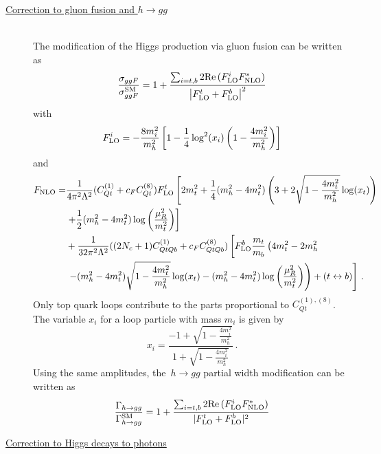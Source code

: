 \begin{description}
	\item [\underline{Correction to gluon fusion and $h\to gg $ }] \hfill \vspace{0.3cm} \\
	The modification of the Higgs production via gluon fusion can be written as
	\begin{equation}
		\frac{\sigma_{ggF}}{\sigma_{ggF}^{\mathrm{SM}}}= 1+ \frac{ \sum_{i=t,b} 2 \mbox{Re}\,(F_{\textrm{LO}}^i F^*_{\textrm{NLO}})}{\left| F_{\textrm{LO}}^t+F_{\textrm{LO}}^b  \right|^2} \label{eq:production}
	\end{equation}
	with 
	\begin{equation}
		F_{\textrm{LO}}^i=-\frac{8m_i^2}{m_h^2}\left[1-\frac{1}{4}\log^2(x_i)\left(1-\frac{4m_i^2}{m_h^2}\right)\right]
	\end{equation}
	and
	\begin{equation}
		\begin{split}
			F_{\textrm{NLO}}=&\frac{ 1}{4\pi^2  \Lambda^2}(C_{Qt}^{(1)}+c_FC_{Qt}^{(8)})F_{\textrm{LO}}^t \left[ 2 m_t^2  +\frac{1}{4} (m_h^2-4 m_t^2) \left( 3 +2 \sqrt{1-\frac{4 m_t^2}{m_h^2}} \log(x_t) \right)  \right. \\ & \left.
			+\frac{1}{2} (m_h^2-4 m_t^2) \log\left(\frac{\mu_R^2}{m_t^2}\right)\right] \\ & + 
			\frac{1}{32 \pi^2 \Lambda^2} ((2N_c+1)C_{QtQb}^{(1)}+c_FC_{QtQb}^{(8)}) \left[ F_{\textrm{LO}}^b \frac{m_t}{m_b}\left( 4 m_t^2-2 m_h^2 \right. \right.\\ & \left. \left. - (m_h^2-4 m_t^2)\sqrt{1-\frac{4 m_t^2}{m_h^2}} \log(x_t)-(m_h^2-4 m_t^2)\log\left(\frac{\mu_R^2}{m_t^2}\right)\right) +(t\leftrightarrow b)\right]  \,. \label{eq:FNLO}
		\end{split}
	\end{equation}
	Only top quark loops contribute to the parts proportional to $C_{Qt}^{(1),(8)}$. 
	The variable $x_i$ for a loop particle with mass $m_i$ is given by
	\begin{equation}
		x_i=\frac{-1+\sqrt{1-\frac{4 m_i^2}{m_h^2}}}{1+\sqrt{1-\frac{4 m_i^2}{m_h^2}}}\,. \label{eq:xvariable}
	\end{equation} 
Using the same amplitudes, the~$ h \to gg$  partial width modification  can be written as
\begin{equation}
	\frac{\Gamma_{h\to gg}}{\Gamma_{h\to gg}^{\mathrm{SM}}}= 1+ \frac{ \sum_{i=t,b} 2 \mbox{Re}\,(F_{\textrm{LO}}^i F^*_{\textrm{NLO}})}{ |F_{\textrm{LO}}^t+F_{\textrm{LO}}^b|^2} 
\end{equation}
	\item [\underline{Correction to Higgs decays to photons }] \hfill  \vspace{0.3cm} \\

\end{description}
